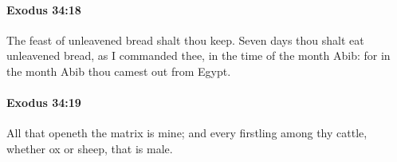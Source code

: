 		\paragraph{Exodus 34:18} %
			\label{EXODUS-34-18}

			The feast of unleavened bread shalt thou keep. Seven days thou shalt eat unleavened bread, as I commanded thee, in the time of the month Abib: for in the month Abib thou camest out from Egypt.


		\paragraph{Exodus 34:19} %
			\label{EXODUS-34-19}

			All that openeth the matrix is mine; and every firstling among thy cattle, whether ox or sheep, that is male.


